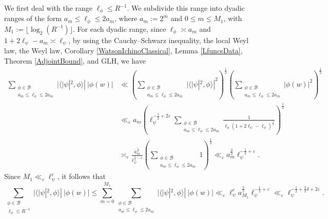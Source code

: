 \documentclass[11pt]{amsart}
\theoremstyle{definition}
\begin{document}
We first deal with the range $\ell_{\phi} \leq R^{-1}$. We subdivide this range into dyadic ranges of the form $a_{m} \leq \ell_{\phi} \leq 2a_{m}$, where $a_{m} := 2^{m}$ and $0\leq m \leq M_1$, with $M_1 := \lfloor \log_{2}(R^{-1}) \rfloor$. For each dyadic range, since $\ell_{\phi} \asymp a_{m}$ and $1+2\ell_{\psi} - a_m \asymp \ell_{\psi}$, by using the Cauchy--Schwarz inequality, the local Weyl law, the Weyl law, Corollary \ref{WatsonIchinoClassical}, Lemma \ref{LfuncsData}, Theorem \ref{AdjointBound}, and GLH, we have 
\begin{align}
    \sum_{\substack{\phi \in \mathcal{B} \\ a_{m} \leq \ell_{\phi} \leq 2a_{m}}} |\langle |\psi|^2, \phi\rangle | \: |\phi(w)| &\ll \left( \sum_{\substack{\phi \in \mathcal{B} \\ a_{m} \leq \ell_{\phi} \leq 2a_{m}}} |\langle |\psi|^2, \phi \rangle|^2 \right)^{\frac{1}{2}} \left( \sum_{\substack{\phi \in \mathcal{B} \\ a_{m} \leq \ell_{\phi} \leq 2a_{m}}} |\phi(w)|^2 \right)^{\frac{1}{2}} \label{MainThmAllCenters-eq3} \\
    &\ll_{\varepsilon} a_{m} \left( \ell_{\psi}^{-\frac{1}{2} + 2\varepsilon} \sum_{\substack{\phi \in \mathcal{B} \\ a_{m} \leq \ell_{\phi} \leq 2a_{m}}} \frac{1}{\ell_{\phi} (1+2\ell_{\psi} - \ell_{\phi})^{\frac{1}{2}}} \right)^{\frac{1}{2}} \nonumber \\
    &\asymp_{\varepsilon} \frac{a_{m}^{\frac{1}{2}}}{\ell_{\psi}^{\frac{1}{4}-\varepsilon}} \left( \sum_{\substack{\phi \in \mathcal{B} \\ a_{m} \leq \ell_{\phi} \leq 2a_{m} }} 1 \right)^{\frac{1}{2}} \ll_{\varepsilon} a_{m}^{\frac{3}{2}} \ell_{\psi}^{-\frac{1}{2} + \varepsilon}. \nonumber
\end{align}
Since $M_1 \ll_{\varepsilon} \ell_{\psi}^{\varepsilon}$, it follows that 
\begin{equation}
    \sum_{\substack{\phi \in \mathcal{B} \\ \ell_{\phi} \leq R^{-1}}} |\langle |\psi|^2, \phi\rangle | \: |\phi(w)| \leq \sum_{m=0}^{M_1} \sum_{\substack{\phi \in \mathcal{B} \\ a_{m} \leq \ell_{\phi} \leq 2a_{m}}} |\langle |\psi|^2, \phi\rangle | \: |\phi(w)| \ll_{\varepsilon} \ell_{\psi}^{\varepsilon} a_{M_1}^{\frac{3}{2}} \ell_{\psi}^{-\frac{1}{2} + \varepsilon} \ll_{\varepsilon} \ell_{\psi}^{-\frac{1}{2} + \frac{3}{2}\delta + 2\varepsilon}. \label{MainThmAllCenters-eq4}
\end{equation}
\end{document}
